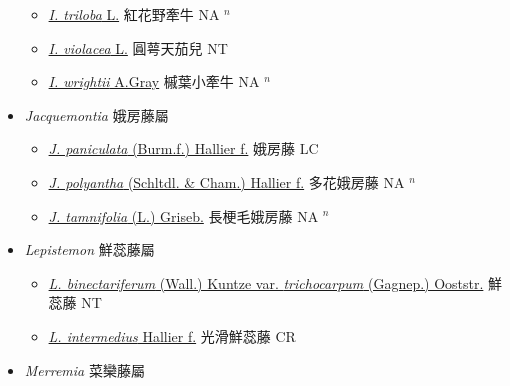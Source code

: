 \begin{itemize}
\begin{itemize}
        \item[] \href{http://www.theplantlist.org/tpl1.1/search?q=Ipomoea+triloba}{\textit{I. triloba} L.}   紅花野牽牛 NA $^n$
        \item[] \href{http://www.theplantlist.org/tpl1.1/search?q=Ipomoea+violacea}{\textit{I. violacea} L.}   圓萼天茄兒 NT
        \item[] \href{http://www.theplantlist.org/tpl1.1/search?q=Ipomoea+wrightii}{\textit{I. wrightii} A.Gray}   槭葉小牽牛 NA $^n$
  \end{itemize}
 \item[] \textit{Jacquemontia} 娥房藤屬
                    
  \begin{itemize}
        \item[] \href{http://www.theplantlist.org/tpl1.1/search?q=Jacquemontia+paniculata}{\textit{J. paniculata} (Burm.f.) Hallier f.}   娥房藤 LC
        \item[] \href{http://www.theplantlist.org/tpl1.1/search?q=Jacquemontia+polyantha}{\textit{J. polyantha} (Schltdl. \& Cham.) Hallier f.}   多花娥房藤 NA $^n$
        \item[] \href{http://www.theplantlist.org/tpl1.1/search?q=Jacquemontia+tamnifolia}{\textit{J. tamnifolia} (L.) Griseb.}   長梗毛娥房藤 NA $^n$
  \end{itemize}
 \item[] \textit{Lepistemon} 鮮蕊藤屬
                    
  \begin{itemize}
        \item[] \href{http://www.theplantlist.org/tpl1.1/search?q=Lepistemon+binectariferum+var.+trichocarpum}{\textit{L. binectariferum} (Wall.) Kuntze var. \textit{trichocarpum} (Gagnep.) Ooststr.}   鮮蕊藤 NT
        \item[] \href{http://www.theplantlist.org/tpl1.1/search?q=Lepistemon+intermedius}{\textit{L. intermedius} Hallier f.}   光滑鮮蕊藤 CR
  \end{itemize}
 \item[] \textit{Merremia} 菜欒藤屬
                    

\end{itemize}
